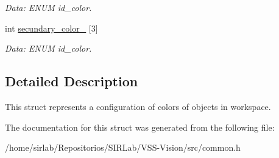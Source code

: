 \begin{DoxyCompactItemize}
\begin{DoxyCompactList}\small\item\em Data\-: E\-N\-U\-M id\-\_\-color. \end{DoxyCompactList}\item 
\hypertarget{structcommon_1_1ExecConfiguration_aea1aed941fceb299c6766e6330ec802e}{int \hyperlink{structcommon_1_1ExecConfiguration_aea1aed941fceb299c6766e6330ec802e}{secundary\-\_\-color\-\_} \mbox{[}3\mbox{]}}\label{structcommon_1_1ExecConfiguration_aea1aed941fceb299c6766e6330ec802e}

\begin{DoxyCompactList}\small\item\em Data\-: E\-N\-U\-M id\-\_\-color. \end{DoxyCompactList}\end{DoxyCompactItemize}


\subsection{Detailed Description}
This struct represents a configuration of colors of objects in workspace. 

The documentation for this struct was generated from the following file\-:\begin{DoxyCompactItemize}
\item 
/home/sirlab/\-Repositorios/\-S\-I\-R\-Lab/\-V\-S\-S-\/\-Vision/src/common.\-h\end{DoxyCompactItemize}
